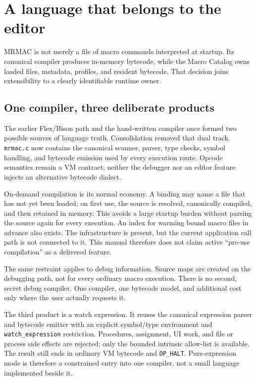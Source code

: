 \documentclass[a4paper,10pt,twoside,openany]{book}
\newcommand{\mrmac}{\textsc{MRMAC}}
\begin{document}
\chapter{A language that belongs to the editor}
\label{ch:mrmac-compiler-values}

\mrmac{} is not merely a file of macro commands interpreted at startup. Its
canonical compiler produces in-memory bytecode, while the Macro Catalog owns
loaded files, metadata, profiles, and resident bytecode. That decision joins
extensibility to a clearly identifiable runtime owner.

\section{One compiler, three deliberate products}

The earlier Flex/Bison path and the hand-written compiler once formed two
possible sources of language truth. Consolidation removed that dual track.
\texttt{mrmac.c} now contains the canonical scanner, parser, type checks,
symbol handling, and bytecode emission used by every execution route. Opcode
semantics remain a VM contract; neither the debugger nor an editor feature
injects an alternative bytecode dialect.

On-demand compilation is its normal economy. A binding may name a file that
has not yet been loaded; on first use, the source is resolved, canonically
compiled, and then retained in memory. This avoids a large startup burden
without parsing the source again for every execution. An index for warming
bound macro files in advance also exists. The infrastructure is present, but
the current application call path is not connected to it. This manual
therefore does not claim active ``pre-use compilation'' as a delivered feature.

The same restraint applies to debug information. Source maps are created on
the debugging path, not for every ordinary macro execution. There is no second,
secret debug compiler. One compiler, one bytecode model, and additional cost
only where the user actually requests it.

The third product is a watch expression. It reuses the canonical expression
parser and bytecode emitter with an explicit symbol/type environment and
\texttt{watch\_expression} restriction. Procedures, assignment, UI work, and
file or process side effects are rejected; only the bounded intrinsic
allow-list is available. The result still ends in ordinary VM bytecode and
\texttt{OP\_HALT}. Pure-expression mode is therefore a constrained entry into
one compiler, not a small language implemented beside it.
\end{document}
